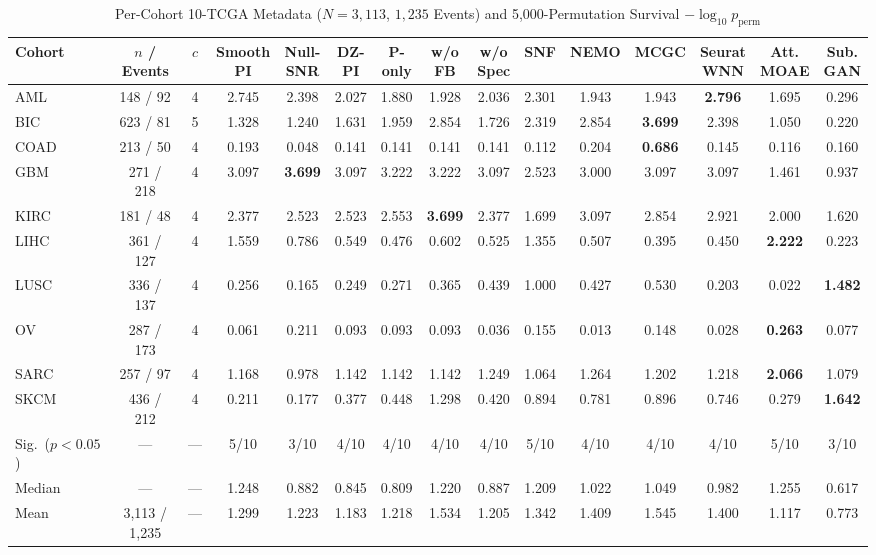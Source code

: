\begin{table}[t]
\centering
\caption{Per-Cohort 10-TCGA Metadata ($N=3{,}113$, $1{,}235$ Events) and 5,000-Permutation Survival $-\log_{10}p_{\mathrm{perm}}$}
\label{tab:p2_stab2}
\scriptsize
\renewcommand{\arraystretch}{1.12}
\setlength{\tabcolsep}{2.1pt}
\begin{tabular}{lcccccccccccccc}
\toprule
Cohort & $n$ / Events & $c$ & \shortstack{Smooth\\PI} & \shortstack{Null-\\SNR} & \shortstack{DZ-\\PI} & \shortstack{P-\\only} & \shortstack{w/o\\FB} & \shortstack{w/o\\Spec} & SNF & NEMO & MCGC & \shortstack{Seurat\\WNN} & \shortstack{Att.\\MOAE} & \shortstack{Sub.\\GAN} \\
\midrule
AML & 148 / 92 & 4 & 2.745 & 2.398 & 2.027 & 1.880 & 1.928 & 2.036 & 2.301 & 1.943 & 1.943 & \textbf{2.796} & 1.695 & 0.296 \\
BIC & 623 / 81 & 5 & 1.328 & 1.240 & 1.631 & 1.959 & 2.854 & 1.726 & 2.319 & 2.854 & \textbf{3.699} & 2.398 & 1.050 & 0.220 \\
COAD & 213 / 50 & 4 & 0.193 & 0.048 & 0.141 & 0.141 & 0.141 & 0.141 & 0.112 & 0.204 & \textbf{0.686} & 0.145 & 0.116 & 0.160 \\
GBM & 271 / 218 & 4 & 3.097 & \textbf{3.699} & 3.097 & 3.222 & 3.222 & 3.097 & 2.523 & 3.000 & 3.097 & 3.097 & 1.461 & 0.937 \\
KIRC & 181 / 48 & 4 & 2.377 & 2.523 & 2.523 & 2.553 & \textbf{3.699} & 2.377 & 1.699 & 3.097 & 2.854 & 2.921 & 2.000 & 1.620 \\
LIHC & 361 / 127 & 4 & 1.559 & 0.786 & 0.549 & 0.476 & 0.602 & 0.525 & 1.355 & 0.507 & 0.395 & 0.450 & \textbf{2.222} & 0.223 \\
LUSC & 336 / 137 & 4 & 0.256 & 0.165 & 0.249 & 0.271 & 0.365 & 0.439 & 1.000 & 0.427 & 0.530 & 0.203 & 0.022 & \textbf{1.482} \\
OV & 287 / 173 & 4 & 0.061 & 0.211 & 0.093 & 0.093 & 0.093 & 0.036 & 0.155 & 0.013 & 0.148 & 0.028 & \textbf{0.263} & 0.077 \\
SARC & 257 / 97 & 4 & 1.168 & 0.978 & 1.142 & 1.142 & 1.142 & 1.249 & 1.064 & 1.264 & 1.202 & 1.218 & \textbf{2.066} & 1.079 \\
SKCM & 436 / 212 & 4 & 0.211 & 0.177 & 0.377 & 0.448 & 1.298 & 0.420 & 0.894 & 0.781 & 0.896 & 0.746 & 0.279 & \textbf{1.642} \\
\midrule
Sig.\ ($p{<}0.05$) & --- & --- & 5/10 & 3/10 & 4/10 & 4/10 & 4/10 & 4/10 & 5/10 & 4/10 & 4/10 & 4/10 & 5/10 & 3/10 \\
Median & --- & --- & 1.248 & 0.882 & 0.845 & 0.809 & 1.220 & 0.887 & 1.209 & 1.022 & 1.049 & 0.982 & 1.255 & 0.617 \\
Mean & 3,113 / 1,235 & --- & 1.299 & 1.223 & 1.183 & 1.218 & 1.534 & 1.205 & 1.342 & 1.409 & 1.545 & 1.400 & 1.117 & 0.773 \\
\bottomrule
\end{tabular}
\end{table}
